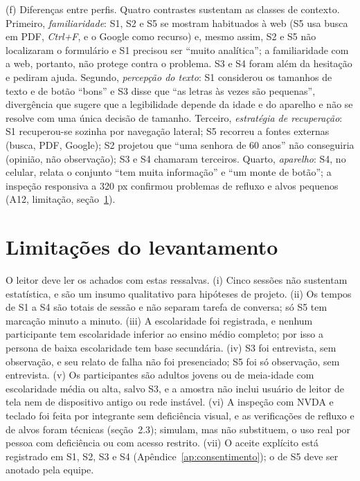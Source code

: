 \documentclass[
  12pt,
  oneside,
  a4paper,
  chapter=TITLE,
  section=TITLE,
  english,
  brazilian
]{abntex2}
\begin{document}
(f) Diferenças entre perfis. Quatro contrastes sustentam as classes de
contexto. Primeiro, \textit{familiaridade}: S1, S2 e S5 se mostram habituados à
web (S5 usa busca em PDF, \textit{Ctrl+F}, e o Google como recurso) e, mesmo
assim, S2 e S5 não localizaram o formulário e S1 precisou ser ``muito analítica'';
a familiaridade com a web, portanto, não protege contra o problema. S3 e S4
foram além da hesitação e pediram ajuda. Segundo, \textit{percepção do texto}:
S1 considerou os tamanhos de texto e de botão ``bons'' e S3 disse que ``as
letras às vezes são pequenas'', divergência que sugere que a legibilidade
depende da idade e do aparelho e não se resolve com uma única decisão de
tamanho. Terceiro, \textit{estratégia de recuperação}: S1 recuperou-se sozinha
por navegação lateral; S5 recorreu a fontes externas (busca, PDF, Google); S2
projetou que ``uma senhora de 60 anos'' não conseguiria (opinião, não
observação); S3 e S4 chamaram terceiros. Quarto, \textit{aparelho}: S4, no celular, relata o conjunto ``tem muita informação'' e ``um monte de botão''; a inspeção responsiva a 320 px confirmou problemas de refluxo e alvos pequenos (A12, limitação, seção~\ref{sec:limitacoes}).

\section{Limitações do levantamento}\label{sec:limitacoes}

O leitor deve ler os achados com estas ressalvas. (i) Cinco sessões não
sustentam estatística, e são um insumo qualitativo para hipóteses de projeto.
(ii) Os tempos de S1 a S4 são totais de sessão e não separam tarefa de conversa;
só S5 tem marcação minuto a minuto. (iii) A escolaridade foi registrada, e
nenhum participante tem escolaridade inferior ao ensino médio completo; por isso
a persona de baixa escolaridade tem base secundária. (iv) S3 foi entrevista, sem
observação, e seu relato de falha não foi presenciado; S5 foi só observação, sem
entrevista. (v) Os participantes são adultos jovens ou de meia-idade com
escolaridade média ou alta, salvo S3, e a amostra não inclui usuário de leitor de
tela nem de dispositivo antigo ou rede instável. (vi) A inspeção com NVDA e teclado
foi feita por integrante sem deficiência visual, e as verificações de refluxo e de
alvos foram técnicas (seção~2.3); simulam, mas não substituem, o uso real por pessoa
com deficiência ou com acesso restrito. (vii) O aceite explícito está registrado em S1,
S2, S3 e S4 (Apêndice~\ref{ap:consentimento}); o de S5 deve ser anotado pela equipe.
\end{document}
